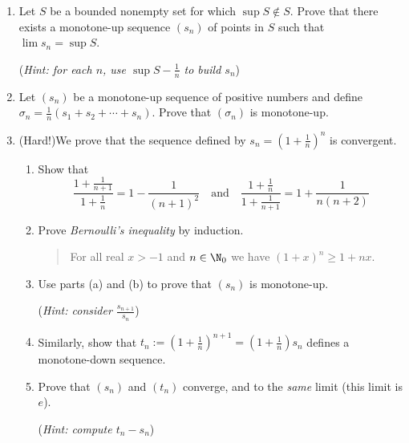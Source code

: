 \begin{exercisessec}{}{}
\begin{enumerate}
  
  \item%
  Let $S$ be a bounded nonempty set for which $\sup S\notin S$. Prove that there exists a monotone-up sequence $(s_n)$ of points in $S$ such that $\lim s_n=\sup S$.\par
  (\emph{Hint: for each $n$, use $\sup S-\frac 1n$ to build $s_n$})
  
  
  \item%
  Let $(s_n)$ be a monotone-up sequence of positive numbers and define $\sigma_n=\frac 1n(s_1+s_2+\cdots+s_n)$. Prove that $(\sigma_n)$ is monotone-up.

  
  
  \item\label{exs:edefn} (Hard!)\lstsp We prove that the sequence defined by $s_n=\left(1+\frac 1n\right)^n$ is convergent.
  \begin{enumerate}
    \item Show that
    \[\frac{1+\frac 1{n+1}}{1+\frac 1n}=1-\frac 1{(n+1)^2}\quad \text{and}\quad \frac{1+\frac 1n}{1+\frac 1{n+1}}=1+\frac 1{n(n+2)}\]
	  \item Prove \emph{Bernoulli's inequality} by induction.
	  \begin{quote}
	  	For all real $x>-1$ and $n\in\N_0$ we have $(1+x)^n\ge 1+nx$.
	  \end{quote}
		\item Use parts (a) and (b) to prove that $(s_n)$ is monotone-up.\par
		(\emph{Hint: consider $\frac{s_{n+1}}{s_n}$}) 
		\item Similarly, show that $t_n:=\left(1+\frac 1n\right)^{n+1} =\left(1+\frac 1n\right)s_n$ defines a monotone-down sequence.
		\item Prove that $(s_n)$ and $(t_n)$ converge, and to the \emph{same} limit (this limit is $e$).\par
		(\emph{Hint: compute $t_n-s_n$})
	\end{enumerate}
  



\end{enumerate}
\end{exercisessec}
